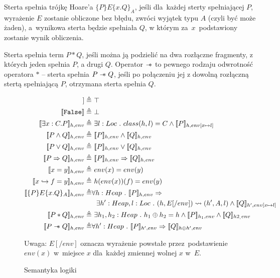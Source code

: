 \documentclass[]{pracamgr}
\newcommand \wand {\mathrel{-\mkern-6mu*}}
\newcommand \hoare [5] {\{#1\}#2\{#4.#5\}_#3}
\renewcommand \| {\hspace{0.75em} | \hspace{0.75em} }
\renewcommand \[ {[\![}
\renewcommand \] {]\!]}
\theoremstyle{definition}
\begin{document}
Sterta spełnia trójkę Hoare'a $\hoare{P}{E}{A}{x}{Q}$, jeśli dla~każdej sterty spełniającej
$P$, wyrażenie $E$ zostanie obliczone bez błędu, zwróci wyjątek typu $A$ (czyli być może żaden),
a~wynikowa sterta będzie
spełniała $Q$, w którym za~$x$~podstawiony zostanie wynik obliczenia.

Sterta spełnia term $P * Q$, jeśli można ją podzielić na dwa rozłączne fragmenty, z których
jeden spełnia $P$, a drugi $Q$.
Operator $\wand$ to pewnego rodzaju odwrotność operatora $*$ -- sterta spełnia $P \wand Q$, jeśli
po połączeniu jej z dowolną rozłączną stertą spełniającą $P$, otrzymana sterta spełnia $Q$.

\begin{figure}[H]
\begin{align*}
 \[ \texttt{True} \] \triangleq & \ \top \\
 \[ \texttt{False} \] \triangleq & \ \bot \\
 \[ \exists x : C . P \]_{h, env} \triangleq & \ \exists l : Loc\ .\ class(h, l) = C \wedge
    \[ P \]_{h, env[x \mapsto l]}  \\
 \[ P \wedge Q \]_{h, env} \triangleq & \ \[ P \]_{h, env} \wedge \[ Q \]_{h, env} \\
 \[ P \vee Q \]_{h, env} \triangleq & \ \[ P \]_{h, env} \vee \[ Q \]_{h, env} \\
 \[ P \Rightarrow Q \]_{h, env} \triangleq & \ \[ P \]_{h, env} \Rightarrow \[ Q \]_{h, env} \\
 \[ x = y \]_{h, env} \triangleq & \ env(x) = env(y) \\
 \[ x \hookrightarrow f = y \]_{h, env} \triangleq & \ h(env(x))(f) = env(y) \\
 \[ \hoare{P}{E}{A}{x}{Q} \]_{h, env} \triangleq & \forall h : Heap \ . \ \[ P \]_{h, env} \Rightarrow \\
      & \ \  \exists h' : Heap, l : Loc \ . \ (h, E[/env]) \leadsto (h', A, l) \wedge
      \[ Q \]_{h', env[x \mapsto l]}  \\
 \[ P * Q \]_{h, env} \triangleq & \ \exists h_1,h_2 : Heap\ .\ h_1 \oplus h_2 = h \wedge
    \[ P \]_{h_1, env} \wedge \[ Q \]_{h2_, env}  \\
 \[ P \wand Q \]_{h, env} \triangleq & \forall h' : Heap \ . \ \[ P \]_{h', env} \Rightarrow \[ Q \]_{h \oplus h', env}
\end{align*}

Uwaga: $E[/env]$ oznacza wyrażenie powstałe przez~podstawienie $env(x)$ w~miejsce $x$ dla~każdej zmiennej
wolnej $x$ w~$E$.

\caption{Semantyka logiki}
\label{fig:sematics}
\end{figure}
\end{document}
